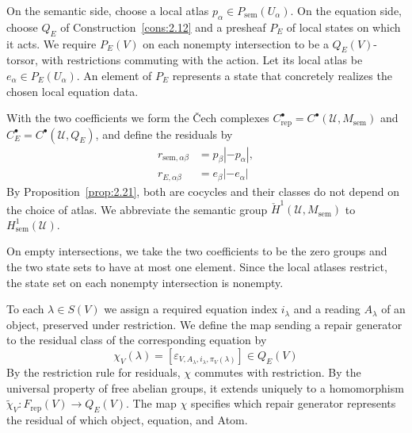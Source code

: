 \begin{definition}\label{def:2.45}

On the semantic side, choose a local atlas $p_\alpha\in P_{\mathrm{sem}}(U_\alpha)$. On
the equation side, choose $Q_E$ of Construction~\ref{cons:2.12} and a presheaf $P_E$ of
local states on which it acts. We require $P_E(V)$ on each nonempty intersection to be a
$Q_E(V)$-torsor, with restrictions commuting with the action. Let its local atlas be
$e_\alpha\in P_E(U_\alpha)$. An element of $P_E$ represents a state that concretely
realizes the chosen local equation data.

With the two coefficients we form the \v{C}ech complexes
$C^\bullet_{\mathrm{rep}}=C^\bullet(\mathcal{U},M_{\mathrm{sem}})$ and
$C^\bullet_E=C^\bullet(\mathcal{U},Q_E)$, and define the residuals by
\begin{equation*}
\begin{aligned}
r_{\mathrm{sem},\alpha\beta}&=p_\beta|-p_\alpha|,\\
r_{E,\alpha\beta}&=e_\beta|-e_\alpha|
\end{aligned}
\tag{2.29}\label{eq:2.29}
\end{equation*}
By Proposition~\ref{prop:2.21}, both are cocycles and their classes do not depend on the
choice of atlas. We abbreviate the semantic group
$\check H^1(\mathcal{U},M_{\mathrm{sem}})$ to $H^1_{\mathrm{sem}}(\mathcal{U})$.

On empty intersections, we take the two coefficients to be the zero groups and the
two state sets to have at most one element. Since the local atlases restrict, the state set on each
nonempty intersection is nonempty.

\end{definition}

\begin{construction}\label{cons:2.46}

To each $\lambda\in S(V)$ we assign a required equation index $i_\lambda$ and a reading
$A_\lambda$ of an object, preserved under restriction. We define the map sending a
repair generator to the residual class of the corresponding equation by
\begin{equation*}
\chi_V(\lambda)
=[\varepsilon_{V,A_\lambda,i_\lambda,\pi_V(\lambda)}]
\in Q_E(V)
\tag{2.30}\label{eq:2.30}
\end{equation*}
By the restriction rule for residuals, $\chi$ commutes with restriction. By the
universal property of free abelian groups, it extends uniquely to a homomorphism
$\widetilde\chi_V:F_{\mathrm{rep}}(V)\to Q_E(V)$. The map $\chi$ specifies which repair
generator represents the residual of which object, equation, and Atom.

\end{construction}

